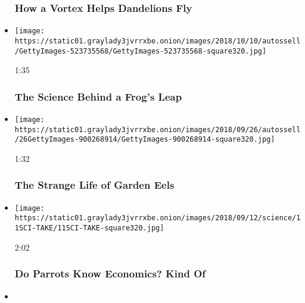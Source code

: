 \begin{itemize}
  \hypertarget{how-a-vortex-helps-dandelions-fly}{%
  \subsubsection{How a Vortex Helps Dandelions
  Fly}\label{how-a-vortex-helps-dandelions-fly}}
\item
  \href{https://www.nytimes3xbfgragh.onion/video/science/100000006102476/frog-jump-study.html?action=click\&module=video-series-bar\&region=header\&pgtype=Article\&playlistId=video/sciencetake}{}

  \texttt{[image: https://static01.graylady3jvrrxbe.onion/images/2018/10/10/autossell/GettyImages-523735568/GettyImages-523735568-square320.jpg]}

  1:35

  \hypertarget{the-science-behind-a-frogs-leap}{%
  \subsubsection{The Science Behind a Frog's
  Leap}\label{the-science-behind-a-frogs-leap}}
\item
  \href{https://www.nytimes3xbfgragh.onion/video/science/100000006090485/the-strange-life-of-garden-eels.html?action=click\&module=video-series-bar\&region=header\&pgtype=Article\&playlistId=video/sciencetake}{}

  \texttt{[image: https://static01.graylady3jvrrxbe.onion/images/2018/09/26/autossell/26GettyImages-900268914/GettyImages-900268914-square320.jpg]}

  1:32

  \hypertarget{the-strange-life-of-garden-eels}{%
  \subsubsection{The Strange Life of Garden
  Eels}\label{the-strange-life-of-garden-eels}}
\item
  \href{https://www.nytimes3xbfgragh.onion/video/science/100000006079698/parrots-economics-study.html?action=click\&module=video-series-bar\&region=header\&pgtype=Article\&playlistId=video/sciencetake}{}

  \texttt{[image: https://static01.graylady3jvrrxbe.onion/images/2018/09/12/science/11SCI-TAKE/11SCI-TAKE-square320.jpg]}

  2:02

  \hypertarget{do-parrots-know-economics-kind-of}{%
  \subsubsection{Do Parrots Know Economics? Kind
  Of}\label{do-parrots-know-economics-kind-of}}
\item
  \href{https://www.nytimes3xbfgragh.onion/video/science/100000006042011/what-ducks-hear-underwater.html?action=click\&module=video-series-bar\&region=header\&pgtype=Article\&playlistId=video/sciencetake}{}


\end{itemize}
